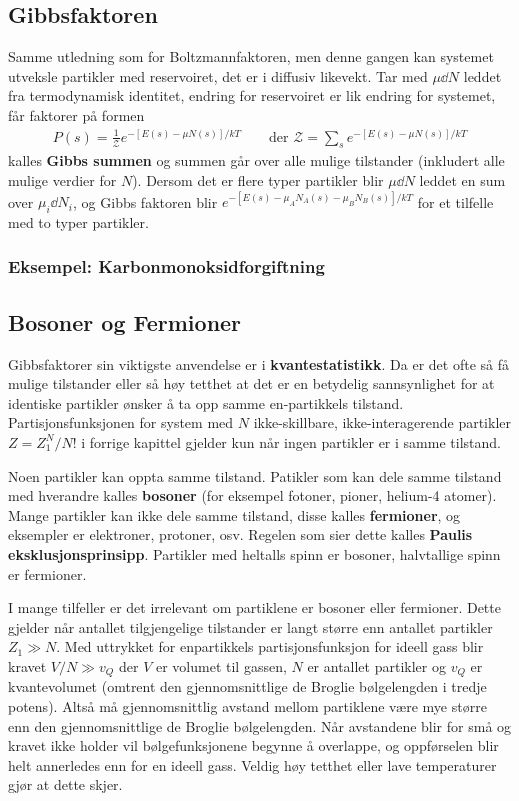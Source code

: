 \documentclass[12pt]{article}
\begin{document}
\subsection{Gibbsfaktoren}
Samme utledning som for Boltzmannfaktoren, men denne gangen kan systemet utveksle
partikler med reservoiret, det er i diffusiv likevekt. Tar med $\mu \dd N$ leddet
fra termodynamisk identitet, endring for reservoiret er lik endring for systemet, får
faktorer på formen
\begin{align*}
  P(s) = \frac{1}{\mathcal{Z}} e^{-[E(s) - \mu N(s)]/kT} \qquad \text{der } \mathcal{Z} = \sum_s e^{-[E(s) - \mu N(s)]/kT}
\end{align*}
kalles \textbf{Gibbs summen} og summen går over alle mulige tilstander (inkludert alle mulige verdier for $N$).
Dersom det er flere typer partikler blir $\mu \dd N$ leddet en sum over $\mu_i \dd N_i$, og Gibbs faktoren blir
$e^{-[E(s) - \mu_A N_A(s) - \mu_B N_B(s)]/kT}$ for et tilfelle med to typer partikler.
\subsubsection{Eksempel: Karbonmonoksidforgiftning}
\subsection{Bosoner og Fermioner}
Gibbsfaktorer sin viktigste anvendelse er i \textbf{kvantestatistikk}. Da er det ofte
så få mulige tilstander eller så høy tetthet at det er en betydelig sannsynlighet
for at identiske partikler ønsker å ta opp samme en-partikkels tilstand. Partisjonsfunksjonen
for system med $N$ ikke-skillbare, ikke-interagerende partikler $Z = Z_1^N / N!$ i forrige
kapittel gjelder kun når ingen partikler er i samme tilstand.

Noen partikler kan oppta samme tilstand. Patikler som kan dele samme tilstand
med hverandre kalles \textbf{bosoner} (for eksempel fotoner, pioner, helium-4 atomer).
Mange partikler kan ikke dele samme tilstand, disse kalles \textbf{fermioner}, og
eksempler er elektroner, protoner, osv. Regelen som sier dette kalles \textbf{Paulis eksklusjonsprinsipp}.
Partikler med heltalls spinn er bosoner, halvtallige spinn er fermioner.

I mange tilfeller er det irrelevant om partiklene er bosoner eller fermioner. Dette gjelder
når antallet tilgjengelige tilstander er langt større enn antallet partikler $Z_1 \gg N$.
Med uttrykket for enpartikkels partisjonsfunksjon for ideell gass blir kravet $V/N \gg v_Q$
der $V$ er volumet til gassen, $N$ er antallet partikler og $v_Q$ er kvantevolumet (omtrent
den gjennomsnittlige de Broglie bølgelengden i tredje potens). Altså må gjennomsnittlig
avstand mellom partiklene være mye større enn den gjennomsnittlige de Broglie bølgelengden.
Når avstandene blir for små og kravet ikke holder vil bølgefunksjonene begynne å overlappe,
og oppførselen blir helt annerledes enn for en ideell gass. Veldig høy tetthet eller
lave temperaturer gjør at dette skjer.
\end{document}
